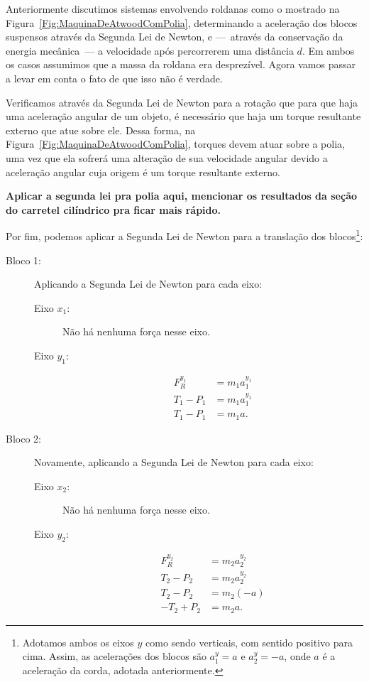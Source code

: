 Anteriormente discutimos sistemas envolvendo roldanas como o mostrado na Figura~\ref{Fig:MaquinaDeAtwoodComPolia}, determinando a aceleração dos blocos suspensos através da Segunda Lei de Newton, e ---~através da conservação da energia mecânica~--- a velocidade após percorrerem uma distância $d$. Em ambos os casos assumimos que a massa da roldana era desprezível. Agora vamos passar a levar em conta o fato de que isso não é verdade.

Verificamos através da Segunda Lei de Newton para a rotação que para que haja uma aceleração angular de um objeto, é necessário que haja um torque resultante externo que atue sobre ele. Dessa forma, na Figura~\ref{Fig:MaquinaDeAtwoodComPolia}, torques devem atuar sobre a polia, uma vez que ela sofrerá uma alteração de sua velocidade angular devido a aceleração angular cuja origem é um torque resultante externo.

\textbf{Aplicar a segunda lei pra polia aqui, mencionar os resultados da seção do carretel  cilíndrico pra ficar mais rápido.}

Por fim, podemos aplicar a Segunda Lei de Newton para a translação dos blocos\footnote{Adotamos ambos os eixos $y$ como sendo verticais, com sentido positivo para cima. Assim, as acelerações dos blocos são $a_1^y = a$ e $a_2^y = -a$, onde $a$ é a aceleração da corda, adotada anteriormente.}:
\begin{description}
    \item[Bloco 1:] Aplicando a Segunda Lei de Newton para cada eixo:
        \begin{description}
            \item[Eixo $x_1$:] Não há nenhuma força nesse eixo.
            \item[Eixo $y_1$:]
                \begin{align}
                    F_R^{y_1} &= m_1 a_1^{y_1} \\
                    T_1 - P_1 &= m_1 a_1^{y_1} \\
                    T_1 - P_1 &= m_1 a.
                \end{align}
        \end{description}
    \item[Bloco 2:] Novamente, aplicando a Segunda Lei de Newton para cada eixo:
        \begin{description}
            \item[Eixo $x_2$:] Não há nenhuma força nesse eixo.
            \item[Eixo $y_2$:]
                \begin{align}
                    F_R^{y_2} &= m_2 a_2^{y_2} \\
                    T_2 - P_2 &= m_2 a_2^{y_2} \\
                    T_2 - P_2 &= m_2 (-a) \\
                    - T_2 + P_2 &= m_2 a.
                \end{align}
        \end{description}
\end{description}

